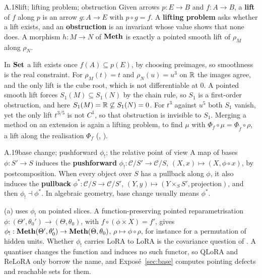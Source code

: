 
\begin{bgentry}{A.18}{lift; lifting problem; obstruction}
Given arrows $p:E\to B$ and $f:A\to B$, a \textbf{lift} of $f$ along $p$ is an arrow $g:A\to E$ with $p\circ g=f$. A
\textbf{lifting problem} asks whether a lift exists, and an \textbf{obstruction} is an invariant whose value shows that
none does. A morphism $h:M\to N$ of $\mathbf{Meth}$ is exactly a pointed smooth lift of $\rho_M$ along $\rho_N$.
\end{bgentry}

In $\mathbf{Set}$ a lift exists once $f(A)\subseteq p(E)$, by choosing preimages, so smoothness is the real constraint. For
$\rho_M(t)=t$ and $\rho_N(u)=u^3$ on $\mathbb{R}$ the images agree, and the only lift is the cube root, which is not
differentiable at $0$. A pointed smooth lift forces $S_1(M)\subseteq S_1(N)$ by the chain rule, so $S_1$ is a
first-order obstruction, and here $S_1(M)=\mathbb{R}\not\subseteq S_1(N)=0$. For $t^3$ against $u^5$ both $S_1$ vanish, yet the
only lift $t^{3/5}$ is not $C^1$, so that obstruction is invisible to $S_1$. Merging a method on an extension is again a
lifting problem, to find $\mu$ with $\Phi_f\circ\mu=\Phi_{\tilde f}\circ\rho$, a lift along the realisation $\Phi_f$
(, ).


\begin{bgentry}{A.19}{base change; pushforward $\phi_!$; the relative point of view}
A map of bases $\phi:S'\to S$ induces the \textbf{pushforward} $\phi_!:\mathcal C/S'\to\mathcal C/S$,
$(X,x)\mapsto(X,\phi\circ x)$, by postcomposition. When every object over $S$ has a pullback along $\phi$, it also
induces the \textbf{pullback} $\phi^*:\mathcal C/S\to\mathcal C/S'$, $(Y,y)\mapsto(Y\times_SS',\text{projection})$, and
then $\phi_!\dashv\phi^*$. In algebraic geometry, base change usually means $\phi^*$.
\end{bgentry}

(a) uses $\phi_!$ on pointed slices. A function-preserving pointed reparametrisation
$\phi:(\Theta',\theta_0')\to(\Theta,\theta_0)$, with $f\circ(\phi\times X)=f'$, gives
$\phi_!:\mathbf{Meth}(\Theta',\theta_0')\to\mathbf{Meth}(\Theta,\theta_0)$, $\rho\mapsto\phi\circ\rho$, for instance for a permutation
of hidden units. Whether $\phi_!$ carries LoRA to LoRA is the covariance question of . A
quantiser changes the function and induces no such functor, so QLoRA \citep{dettmers2023qlora} and ReLoRA
\citep{lialin2023relora} only borrow the name, and Exposé~\ref{sec:base} computes pointing defects and reachable sets for
them.

